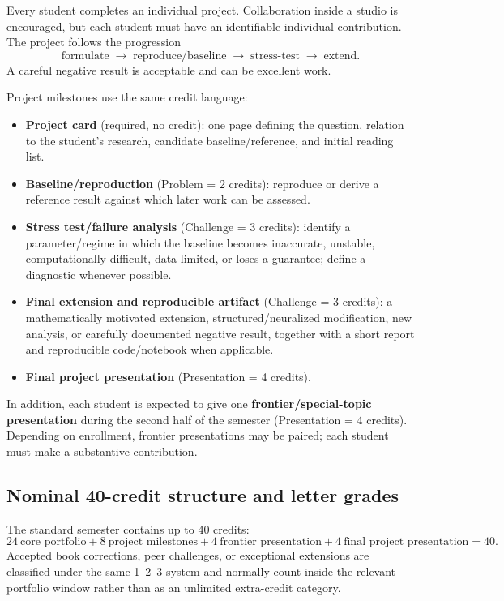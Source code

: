 \documentclass[11pt]{article}
\begin{document}
Every student completes an individual project. Collaboration inside a studio is encouraged, but each student must have an identifiable individual contribution. The project follows the progression
\[
\boxed{\text{formulate} \;\longrightarrow\; \text{reproduce/baseline} \;\longrightarrow\; \text{stress-test} \;\longrightarrow\; \text{extend}.}
\]
A careful negative result is acceptable and can be excellent work.

Project milestones use the same credit language:
\begin{itemize}
\item \textbf{Project card} (required, no credit): one page defining the question, relation to the student's research, candidate baseline/reference, and initial reading list.
\item \textbf{Baseline/reproduction} (Problem = 2 credits): reproduce or derive a reference result against which later work can be assessed.
\item \textbf{Stress test/failure analysis} (Challenge = 3 credits): identify a parameter/regime in which the baseline becomes inaccurate, unstable, computationally difficult, data-limited, or loses a guarantee; define a diagnostic whenever possible.
\item \textbf{Final extension and reproducible artifact} (Challenge = 3 credits): a mathematically motivated extension, structured/neuralized modification, new analysis, or carefully documented negative result, together with a short report and reproducible code/notebook when applicable.
\item \textbf{Final project presentation} (Presentation = 4 credits).
\end{itemize}

In addition, each student is expected to give one \textbf{frontier/special-topic presentation} during the second half of the semester (Presentation = 4 credits). Depending on enrollment, frontier presentations may be paired; each student must make a substantive contribution.

\subsection*{Nominal 40-credit structure and letter grades}

The standard semester contains up to 40 credits:
\[
24\ \text{core portfolio} + 8\ \text{project milestones} + 4\ \text{frontier presentation} + 4\ \text{final project presentation} = 40.
\]
Accepted book corrections, peer challenges, or exceptional extensions are classified under the same 1--2--3 system and normally count inside the relevant portfolio window rather than as an unlimited extra-credit category.
\end{document}
